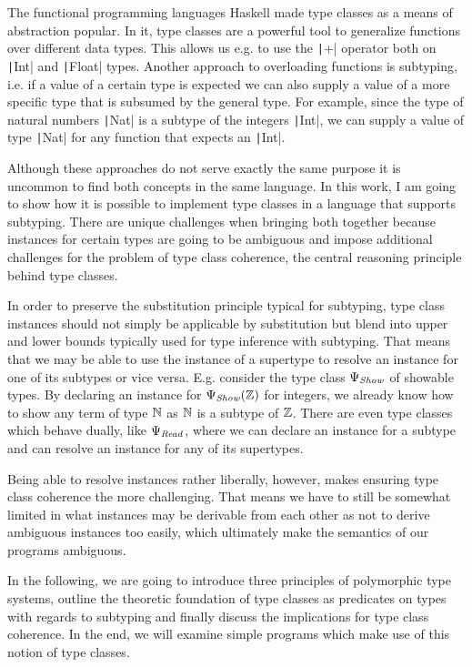The functional programming languages Haskell made type classes as a means of abstraction popular.
In it, type classes are a powerful tool to generalize functions over different data types.
This allows us e.g. to use the \texttt|+| operator both on \texttt|Int| and \texttt|Float| types.
Another approach to overloading functions is subtyping, i.e. if a value of a certain type is expected we can also supply a value of a more specific type that is subsumed by the general type.
For example, since the type of natural numbers \texttt|Nat| is a subtype of the integers \texttt|Int|, we can supply a value of type \texttt|Nat| for any function that expects an \texttt|Int|.

Although these approaches do not serve exactly the same purpose it is uncommon to find both concepts in the same language.
In this work, I am going to show how it is possible to implement type classes in a language that supports subtyping.
There are unique challenges when bringing both together because instances for certain types are going to be ambiguous and impose additional challenges for the problem of type class coherence, the central reasoning principle behind type classes.

In order to preserve the substitution principle typical for subtyping, type class instances should not simply be applicable by substitution but blend into upper and lower bounds typically used for type inference with subtyping.
That means that we may be able to use the instance of a supertype to resolve an instance for one of its subtypes or vice versa.
E.g. consider the type class $\Psi_\mathit{Show}$ of showable types.
By declaring an instance for $\Psi_\mathit{Show}(\mathbb{Z})$ for integers, we already know how to show any term of type $\mathbb{N}$ as $\mathbb{N}$ is a subtype of $\mathbb{Z}$.
There are even type classes which behave dually, like $\Psi_\mathit{Read}$, where we can declare an instance for a subtype and can resolve an instance for any of its supertypes.

Being able to resolve instances rather liberally, however, makes ensuring type class coherence the more challenging.
That means we have to still be somewhat limited in what instances may be derivable from each other as not to derive ambiguous instances too easily, which ultimately make the semantics of our programs ambiguous.\

In the following, we are going to introduce three principles of polymorphic type systems, outline the theoretic foundation of type classes as predicates on types with regards to subtyping and finally discuss the implications for type class coherence.
In the end, we will examine simple programs which make use of this notion of type classes.

